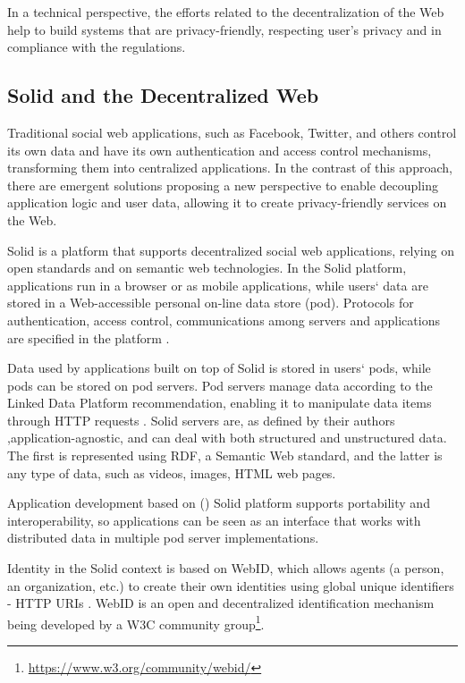 \documentclass[sigconf]{acmart}
\begin{document}
In a technical perspective, the efforts related to the decentralization of the Web help to build systems that are privacy-friendly, respecting user's privacy and in compliance with the regulations.

\subsection{Solid and the Decentralized Web}
Traditional social web applications, such as Facebook, Twitter, and others control its own data and have its own authentication and access control mechanisms, transforming them into centralized applications. In the contrast of this approach, there are emergent solutions proposing a new perspective to enable decoupling application logic and user data, allowing it to create privacy-friendly services on the Web.

Solid is a platform that supports decentralized social web applications, relying on open standards and on semantic web technologies. In the Solid platform, applications run in a browser or as mobile applications, while users` data are stored in a Web-accessible personal on-line data store (pod). Protocols for authentication, access control, communications among servers and applications are specified in the platform \cite{Sambra2016}.

Data used by applications built on top of Solid is stored in users` pods, while pods can be stored on pod servers. Pod servers manage data according to the Linked Data Platform recommendation, enabling it to manipulate data items through HTTP requests \cite{LDP}. Solid servers are, as defined by their authors \cite{Sambra2016},\linebreak application-agnostic, and can deal with both structured and unstructured data. The first is represented using RDF, a Semantic Web standard, and the latter is any type of data, such as videos, images, HTML web pages.

Application development based on () Solid platform supports portability and interoperability, so applications can be seen as an interface that works with distributed data in multiple pod server implementations.

Identity in the Solid context is based on WebID, which allows agents (a person, an organization, etc.) to create their own identities using global unique identifiers - HTTP URIs \cite{Sambra2016solid}. WebID is an open and decentralized identification mechanism being developed by a W3C community group\footnote{\url{https://www.w3.org/community/webid/}}.
\end{document}
